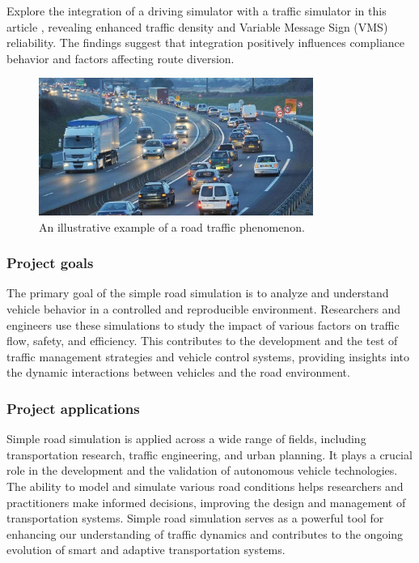 \documentclass{article}
\begin{document}
		Explore the integration of a driving simulator with a traffic simulator in this article \cite{JEIHANI2017164}, revealing enhanced traffic density and Variable Message Sign (VMS) reliability. The findings suggest that integration positively influences compliance behavior and factors affecting route diversion.
		
		
		\begin{figure}[H]
			\centering
			\includegraphics[width=0.8\textwidth]{intro.jpg}
			\caption[Road Traffic]{An illustrative example of a road traffic phenomenon.}
			\label{fig:intro}
		\end{figure}
	
		
		\subsubsection{Project goals}
		The primary goal of the simple road simulation is to analyze and understand vehicle behavior in a controlled and reproducible environment. Researchers and engineers use these simulations to study the impact of various factors on traffic flow, safety, and efficiency. This contributes to the development and the test of traffic management strategies and vehicle control systems, providing insights into the dynamic interactions between vehicles and the road environment.
		
		\subsubsection{Project applications}
		Simple road simulation is applied across a wide range of fields, including transportation research, traffic engineering, and urban planning. It plays a crucial role in the development and the validation of autonomous vehicle technologies. The ability to model and simulate various road conditions helps researchers and practitioners make informed decisions, improving the design and management of transportation systems. Simple road simulation serves as a powerful tool for enhancing our understanding of traffic dynamics and contributes to the ongoing evolution of smart and adaptive transportation systems.
\end{document}
